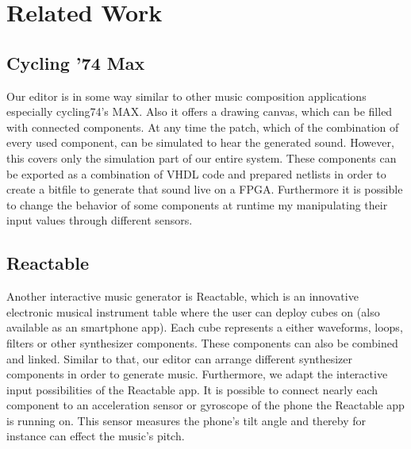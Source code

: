 \chapter{Related Work}
\label{chapter:RelatedWork}
	 
\section{Cycling '74 Max}
	Our editor is in some way similar to other music composition applications especially cycling74's MAX. Also it offers a drawing canvas, which can be filled with connected components. At any time the patch, which of the combination of every used component, can be simulated to hear the generated sound. However, this covers only the simulation part of our entire system. These components can be exported as a combination of VHDL code and prepared netlists in order to create a bitfile to generate that sound live on a FPGA. Furthermore it is possible to change the behavior of some components at runtime my manipulating their input values through different sensors. \\

\section{Reactable}

Another interactive music generator is Reactable, which is an innovative electronic musical instrument table where the user can deploy cubes on (also available as an smartphone app). Each cube represents a either waveforms, loops, filters or other synthesizer components. These components can also be combined and linked. Similar to that, our editor can arrange different synthesizer components in order to generate music. Furthermore, we adapt the interactive input possibilities of the Reactable app. It is possible to connect nearly each component to an acceleration sensor or gyroscope of the phone the Reactable app is running on. This sensor measures the phone's tilt angle and thereby for instance can effect the music's pitch.